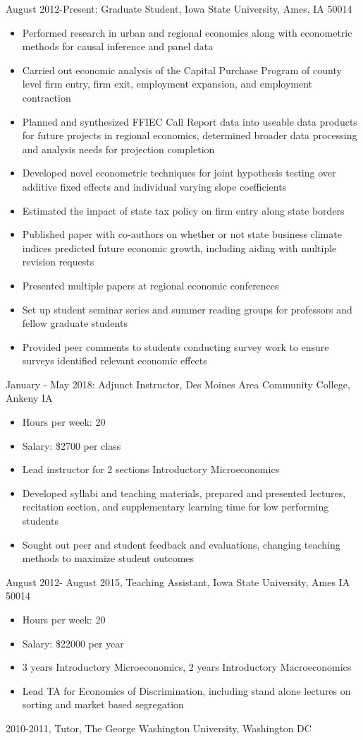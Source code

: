 \documentclass[letterpaper]{article}
\begin{document}
August 2012-Present: Graduate Student, Iowa State University, Ames, IA 50014 \\
\begin{itemize}[noitemsep]
\item Performed research in urban and regional economics along with econometric methods for causal inference and panel data
\item Carried out economic analysis of the Capital Purchase Program of county level firm entry, firm exit, employment expansion, and employment contraction
\item Planned and synthesized FFIEC Call Report data into useable data products for future projects in regional economics, determined broader data processing and analysis needs for projection completion
\item  Developed novel econometric techniques for joint hypothesis testing over additive fixed effects and individual varying slope coefficients
\item Estimated the impact of state tax policy on firm entry along state borders 
\item Published paper with co-authors on whether or not state business climate indices predicted future economic growth, including aiding with multiple revision requests
\item Presented multiple papers at regional economic conferences
\item Set up student seminar series and summer reading groups for professors and fellow graduate students
\item Provided peer comments to students conducting survey work to ensure surveys identified relevant economic effects
\end{itemize}
January - May 2018: Adjunct Instructor, Des Moines Area Community College, Ankeny IA \\
\begin{itemize}[noitemsep]
\item Hours per week: 20
\item Salary: \$2700 per class
\item Lead instructor for 2 sections Introductory Microeconomics
\item Developed syllabi and teaching materials, prepared and presented lectures, recitation section, and supplementary learning time for low performing students
\item Sought out peer and student feedback and evaluations, changing teaching methods to maximize student outcomes
\end{itemize}
August 2012- August 2015, Teaching Assistant, Iowa State University, Ames IA 50014\\
\begin{itemize}[noitemsep]
\item Hours per week: 20 
\item Salary: \$22000 per year
\item 3 years Introductory Microeconomics, 2 years Introductory Macroeconomics
\item Lead TA for Economics of Discrimination, including stand alone lectures on sorting and market based segregation
\end{itemize}
2010-2011, Tutor, The George Washington University, Washington DC
\end{document}
